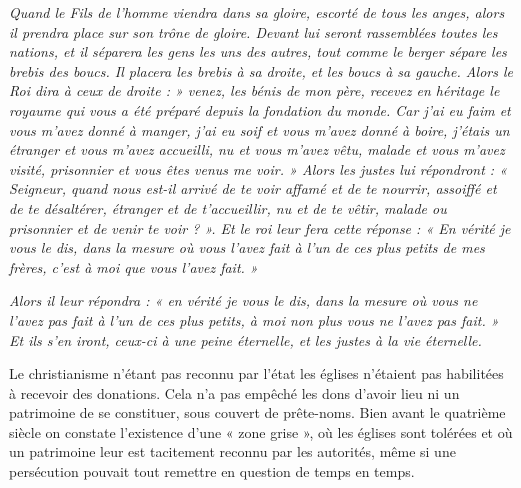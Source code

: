 \begin{displayquote}[Matthieu, 25, 31-40]
\emph{Quand le Fils de l'homme viendra dans sa gloire, escorté de tous les anges, alors il prendra place sur son trône de gloire. Devant lui seront rassemblées toutes les nations, et il séparera les gens les uns des autres, tout comme le berger sépare les brebis des boucs. Il placera les brebis à sa droite, et les boucs à sa gauche. Alors le Roi dira à ceux de droite : » venez, les bénis de mon père, recevez en héritage le royaume qui vous a été préparé depuis la fondation du monde. Car j'ai eu faim et vous m'avez donné à manger, j'ai eu soif et vous m'avez donné à boire, j'étais un étranger et vous m'avez accueilli, nu et vous m'avez vêtu, malade et vous m'avez visité, prisonnier et vous êtes venus me voir. » Alors les justes lui répondront : « Seigneur, quand nous est-il arrivé de te voir affamé et de te nourrir, assoiffé et de te désaltérer, étranger et de t'accueillir, nu et de te vêtir, malade ou prisonnier et de venir te voir ? ». Et le roi leur fera cette réponse : « En vérité je vous le dis, dans la mesure où vous l'avez fait à l'un de ces plus petits de mes frères, c'est à moi que vous l'avez fait. »}
\end{displayquote}

%
\begin{displayquote}[Matthieu 25, 45-46]
\emph{Alors il leur répondra : « en vérité je vous le dis, dans la mesure où vous ne l'avez pas fait à l'un de ces plus petits, à moi non plus vous ne l'avez pas fait. » Et ils s'en iront, ceux-ci à une peine éternelle, et les justes à la vie éternelle.}
\end{displayquote}

 Le christianisme n'étant pas reconnu par l'état les églises n'étaient pas habilitées à recevoir des donations. Cela n'a pas empêché les dons d'avoir lieu ni un patrimoine de se constituer, sous couvert de prête-noms. Bien avant le quatrième siècle on constate l'existence d'une « zone grise », où les églises sont tolérées et où un patrimoine leur est tacitement reconnu par les autorités, même si une persécution pouvait tout remettre en question de temps en temps. 

